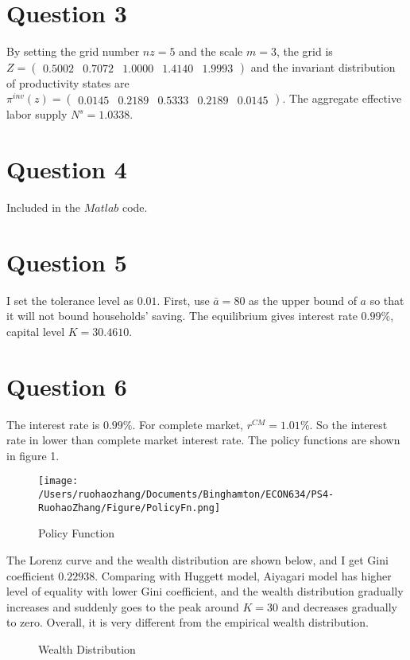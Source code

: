 \documentclass{article}
\begin{document}
\section*{\normalsize{Question 3}}
By setting the grid number $nz=5$ and the scale $m=3$, the grid is  $Z=\begin{pmatrix} 0.5002&0.7072&1.0000&1.4140&1.9993 \end{pmatrix}$ and the invariant distribution of productivity states are $\pi^{inv}(z)=\begin{pmatrix} 0.0145&0.2189&0.5333&0.2189&0.0145\end{pmatrix}$. The aggregate effective labor supply $N^s=1.0338$. 
\section*{\normalsize{Question 4}}
Included in the $Matlab$ code.
\section*{\normalsize{Question 5}}
I set the tolerance level as $0.01$. First, use $\bar{a}=80$ as the upper bound of $a$ so that it will not bound households' saving.  The equilibrium gives interest rate 
$0.99\%$, capital level $K=30.4610$.
\section*{\normalsize{Question 6}}
The interest rate is $0.99\%$. For complete market, $r^{CM}=1.01\%$. So the interest rate in lower than complete market interest rate. The policy functions are shown in figure 1.
\begin{figure}[H]%
	\centering
	\texttt{[image: /Users/ruohaozhang/Documents/Binghamton/ECON634/PS4-RuohaoZhang/Figure/PolicyFn.png]}
	\caption[Optional caption]{Policy Function}
	\label{fig:1}
\end{figure}
The Lorenz curve and the wealth distribution are shown below, and I get Gini coefficient $0.22938$. Comparing with Huggett model, Aiyagari model has higher level of equality with lower Gini coefficient, and the wealth distribution gradually increases and suddenly goes to the peak around $K=30$ and decreases gradually to zero. Overall, it is very different from the empirical wealth distribution.
	\begin{figure}[H]%
		\centering
		\qquad
		\caption{Wealth Distribution}%
		\label{fig:2}%
	\end{figure}
\end{document}
